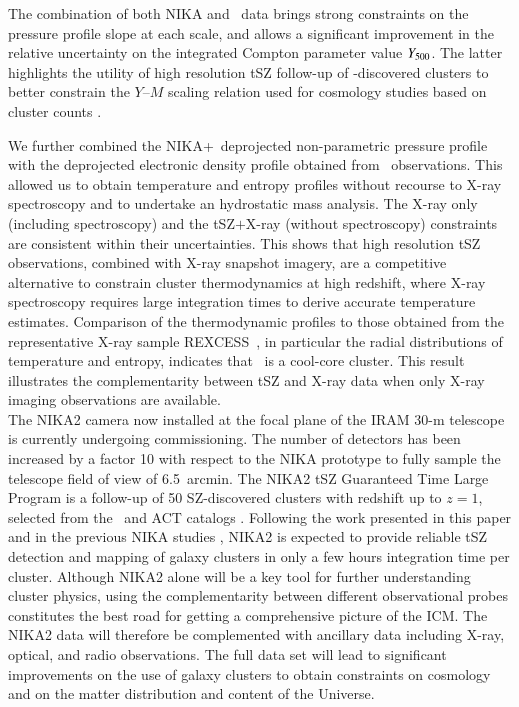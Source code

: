 \documentclass[traditabstract]{aa}
\newcommand{\rexcess}{{\gwpfont REXCESS}}
\begin{document}
The combination of both NIKA and \planck\ data brings strong constraints on the pressure profile slope at each scale, and allows a significant improvement in the relative uncertainty on the integrated Compton parameter value $Y_{500}$. The latter highlights the utility of high resolution tSZ follow-up of \planck-discovered clusters to better constrain the $Y$--$M$ scaling relation used for cosmology studies based on cluster counts \citep{ProceedingMoriond}.

We further combined the NIKA+\planck\ deprojected non-parametric pressure profile with the deprojected electronic density profile obtained from \xmm\ observations. This allowed us to obtain temperature and entropy profiles without recourse to X-ray spectroscopy and to undertake an hydrostatic mass analysis. The X-ray only (including spectroscopy) and the tSZ$+$X-ray (without spectroscopy) constraints are consistent within their uncertainties. This shows that high resolution tSZ observations, combined with X-ray snapshot imagery, are a competitive alternative to constrain cluster thermodynamics at high redshift, where X-ray spectroscopy requires large integration times to derive accurate temperature estimates. Comparison of the thermodynamic profiles to those obtained from the representative X-ray sample \rexcess\ \citep{boe07,universal,entropy_REXCESS}, in particular the radial distributions of temperature and entropy, indicates that \psz\ is a cool-core cluster. This result illustrates the complementarity between tSZ and X-ray data when only X-ray imaging observations are available.\\

The NIKA2 camera now installed at the focal plane of the IRAM 30-m telescope is currently undergoing commissioning. The number of detectors has been increased by a factor 10 with respect to the NIKA prototype to fully sample the telescope field of view of 6.5~arcmin. The NIKA2 tSZ Guaranteed Time Large Program \citep{NIKA2LP} is a follow-up of 50 SZ-discovered clusters with redshift up to $z = 1$, selected from the \planck\ and ACT catalogs \citep{ACT_cluster,Planck_cata2}. Following the work presented in this paper and in the previous NIKA studies \citep{RXJ1347NIKA,CLJ1227NIKA,MACSJ1424NIKA}, NIKA2 is expected to provide reliable tSZ detection and mapping of galaxy clusters in only a few hours integration time per cluster. Although NIKA2 alone will be a key tool for further understanding cluster physics, using the complementarity between different observational probes constitutes the best road for getting a comprehensive picture of the ICM. The NIKA2 data will therefore be complemented with ancillary data including X-ray, optical, and radio observations. The full data set will lead to significant improvements on the use of galaxy clusters to obtain constraints on cosmology and on the matter distribution and content of the Universe.
\end{document}
